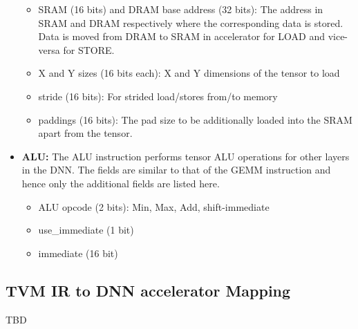 \begin{itemize}
\begin{itemize}
        \item SRAM (16 bits) and DRAM base address (32 bits): The address in SRAM and DRAM respectively where the corresponding data is stored. Data is moved from DRAM to SRAM in accelerator for LOAD and vice-versa for STORE.  
        \item X and Y sizes (16 bits each): X and Y dimensions of the tensor to load 
        \item stride (16 bits): For strided load/stores from/to memory 
        \item paddings (16 bits): The pad size to be additionally loaded into the SRAM apart from the tensor.
    \end{itemize}
    \item \textbf{ALU:} The ALU instruction performs tensor ALU operations for other layers in the DNN. The fields are similar to that of the GEMM instruction and hence only the additional fields are listed here.
    \begin{itemize}
        \item ALU opcode (2 bits): Min, Max, Add, shift-immediate
        \item use\_immediate (1 bit)
        \item immediate (16 bit)
    \end{itemize}
\end{itemize}

\subsection{TVM IR to DNN accelerator Mapping}
TBD

